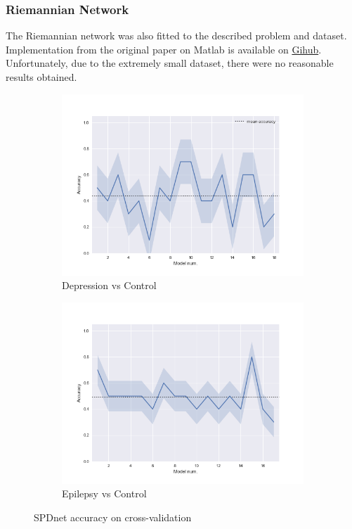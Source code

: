 \documentclass[12pt]{extarticle}
\theoremstyle{definition}
\theoremstyle{remark}
\begin{document}
	
	\subsubsection*{Riemannian Network}
	
	The Riemannian network was also fitted to the described problem and dataset. Implementation from the original paper on Matlab is available on \href{https://github.com/zzhiwu/SPDNet}{Gihub}. Unfortunately, due to the extremely small dataset, there were no reasonable results obtained.
	
	\begin{figure}[H]
		\begin{subfigure}[b]{0.48\textwidth}
			\centering
			\includegraphics[width=\linewidth]{pic/Rnet_dep.png}
			\caption{Depression vs Control}
			\label{fig:bdi}
		\end{subfigure}
		\begin{subfigure}[b]{0.48\textwidth}
			\centering
			\includegraphics[width=\linewidth]{pic/Rnet_ep.png}
			\caption{Epilepsy vs Control}
		\end{subfigure}%
		\caption{SPDnet accuracy on cross-validation}
		\label{fig:spdnet_acc}
	\end{figure}
\end{document}
